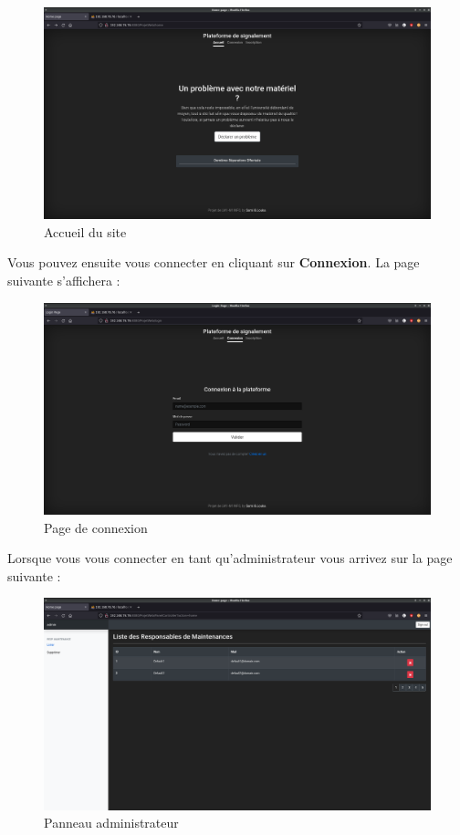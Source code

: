\begin{figure}[!h]
    \centering
    \includegraphics[width=15cm]{img/home.png}
    \caption{Accueil du site}
\end{figure}

Vous pouvez ensuite vous connecter en cliquant sur \textbf{Connexion}. La page suivante
s'affichera :
\begin{figure}[!h]
    \centering
    \includegraphics[width=15cm]{img/sign-in.png}
    \caption{Page de connexion}
\end{figure}
\newpage

Lorsque vous vous connecter en tant qu'administrateur vous arrivez sur la page suivante :
\begin{figure}[!h]
    \centering
    \includegraphics[width=\textwidth]{img/admin.png}
    \caption{Panneau administrateur}
\end{figure}

